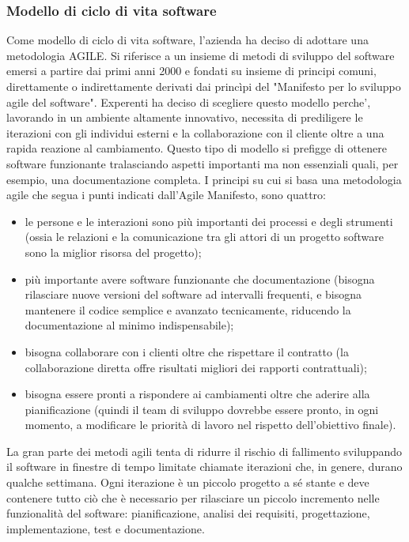 \subsubsection{Modello di ciclo di vita software}
Come modello di ciclo di vita software, l'azienda ha deciso di adottare una metodologia AGILE. Si riferisce a un insieme di metodi di sviluppo del software emersi a partire dai primi anni 2000 e fondati su insieme di principi comuni, direttamente o indirettamente derivati dai princìpi del "Manifesto per lo sviluppo agile del software". Experenti ha deciso di scegliere questo modello perche', lavorando in un ambiente altamente innovativo, necessita di prediligere le iterazioni con gli individui esterni e la collaborazione con il cliente oltre a una rapida reazione al cambiamento. Questo tipo di modello si prefigge di ottenere software funzionante tralasciando aspetti importanti ma non essenziali quali, per esempio, una documentazione completa.
I principi su cui si basa una metodologia agile che segua i punti indicati dall'Agile Manifesto, sono quattro:
\begin{itemize}
	\item le persone e le interazioni sono più importanti dei processi e degli strumenti (ossia le relazioni e la comunicazione tra gli attori di un progetto software sono la miglior risorsa del progetto);
	\item  più importante avere software funzionante che documentazione (bisogna rilasciare nuove versioni del software ad intervalli frequenti, e bisogna mantenere il codice semplice e avanzato tecnicamente, riducendo la documentazione al minimo indispensabile);
	\item bisogna collaborare con i clienti oltre che rispettare il contratto (la collaborazione diretta offre risultati migliori dei rapporti contrattuali);
	\item bisogna essere pronti a rispondere ai cambiamenti oltre che aderire alla pianificazione (quindi il team di sviluppo dovrebbe essere pronto, in ogni momento, a modificare le priorità di lavoro nel rispetto dell'obiettivo finale).
\end{itemize}

La gran parte dei metodi agili tenta di ridurre il rischio di fallimento sviluppando il software in finestre di tempo limitate chiamate iterazioni che, in genere, durano qualche settimana. Ogni iterazione è un piccolo progetto a sé stante e deve contenere tutto ciò che è necessario per rilasciare un piccolo incremento nelle funzionalità del software: pianificazione, analisi dei requisiti, progettazione, implementazione, test e documentazione.

